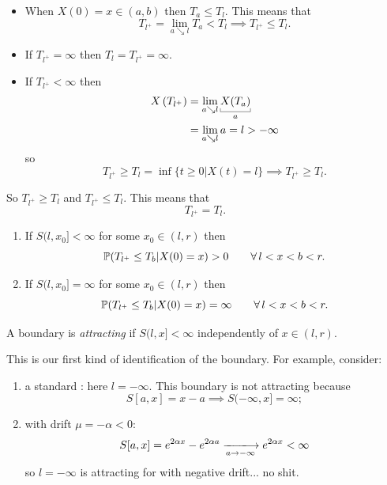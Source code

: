 \documentclass[12pt]{report}
\begin{document}
\begin{fancyproof}
	\begin{itemize}
		\item When $X(0)=x\in(a,b)$ then $T_{a}\leq T_{l}$. This means that 
		\begin{equation*}
		T_{l^{+}}=\lim_{a\searrow l}T_{a}<T_{l}\implies T_{l^{+}}\leq T_{l}.
		\end{equation*}
		\item If $T_{l^{+}}=\infty$ then $T_{l}=T_{l^{+}}=\infty$.
		\item If $T_{l^{+}}<\infty$ then 
		\begin{align*}
			X\left(T_{l^{+}}\right)&=\lim_{a\searrow l}\ubracketthin{X(T_{a})}_{a}\\
			&=\lim_{a\searrow l} a=l>-\infty
		\end{align*}
		so
		\begin{equation*}
			T_{l^{+}}\geq T_{l}=\inf\{t\geq0| X(t)=l\}\implies T_{l^{+}}\geq T_{l}.
		\end{equation*}
	\end{itemize}
	So $T_{l^{+}}\geq T_{l}$ and $T_{l^{+}}\leq T_{l}$. This means that \begin{equation*}
		T_{l^{+}}=T_{l}.
	\end{equation*}
\end{fancyproof}
\begin{lemma}
	\begin{enumerate}
		\item If $S(l,x_{0}]<\infty$ for some $x_{0}\in(l,r)$ then
		\begin{equation*}
			\mathbb{P}(T_{l^{+}}\leq T_{b}|X(0)=x)>0\qquad\forall\, l<x<b<r.
		\end{equation*}
		\item If $S(l,x_{0}]=\infty$ for some $x_{0}\in(l,r)$ then
		\begin{equation*}
			\mathbb{P}(T_{l^{+}}\leq T_{b}|X(0)=x)=\infty\qquad\forall\, l<x<b<r.
		\end{equation*}
	\end{enumerate}
\end{lemma}
\begin{definition}
	A boundary is \emph{attracting} if $S(l,x]<\infty$ independently of $x\in(l,r)$.
\end{definition}
This is our first kind of identification of the boundary. For example, consider:
\begin{enumerate}
	\item a standard \bwm: here $l=-\infty$. This boundary is not attracting because
	\begin{equation*}
		S[a,x]=x-a\implies S(-\infty,x]=\infty;
	\end{equation*}
	\item \bwm{} with drift $\mu=-\alpha<0$:
	\begin{equation*}
		S[a,x]=e^{2\alpha x}-e^{2\alpha a}\xlongrightarrow[a\to-\infty]{}e^{2\alpha x}<\infty
	\end{equation*} 
	so $l=-\infty$ is attracting for \bwm{} with negative drift... no shit.
\end{enumerate}
\end{document}
